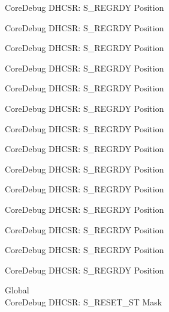 \begin{DoxyRefList}
\label{deprecated__deprecated000173}%
%
Core\+Debug DHCSR\+: S\+\_\+\+REGRDY Position 

\label{deprecated__deprecated000258}%
%
Core\+Debug DHCSR\+: S\+\_\+\+REGRDY Position 

\label{deprecated__deprecated000315}%
%
Core\+Debug DHCSR\+: S\+\_\+\+REGRDY Position 

\label{deprecated__deprecated000391}%
%
Core\+Debug DHCSR\+: S\+\_\+\+REGRDY Position 

\label{deprecated__deprecated000478}%
%
Core\+Debug DHCSR\+: S\+\_\+\+REGRDY Position 

\label{deprecated__deprecated000580}%
%
Core\+Debug DHCSR\+: S\+\_\+\+REGRDY Position 

\label{deprecated__deprecated000705}%
%
Core\+Debug DHCSR\+: S\+\_\+\+REGRDY Position 

\label{deprecated__deprecated000797}%
%
Core\+Debug DHCSR\+: S\+\_\+\+REGRDY Position 

\label{deprecated__deprecated000851}%
%
Core\+Debug DHCSR\+: S\+\_\+\+REGRDY Position 

\label{deprecated__deprecated000936}%
%
Core\+Debug DHCSR\+: S\+\_\+\+REGRDY Position 

\label{deprecated__deprecated000993}%
%
Core\+Debug DHCSR\+: S\+\_\+\+REGRDY Position 

\label{deprecated__deprecated001069}%
%
Core\+Debug DHCSR\+: S\+\_\+\+REGRDY Position 

\label{deprecated__deprecated001156}%
%
Core\+Debug DHCSR\+: S\+\_\+\+REGRDY Position 

\label{deprecated__deprecated001258}%
%
Core\+Debug DHCSR\+: S\+\_\+\+REGRDY Position  
\item[Global \doxylink{group___c_m_s_i_s___core_debug_gac474394bcceb31a8e09566c90b3f8922}{Core\+Debug\+\_\+\+DHCSR\+\_\+\+S\+\_\+\+RESET\+\_\+\+ST\+\_\+\+Msk} ]\hfill \\
\label{deprecated__deprecated000010}%
%
Core\+Debug DHCSR\+: S\+\_\+\+RESET\+\_\+\+ST Mask 


\end{DoxyRefList}
